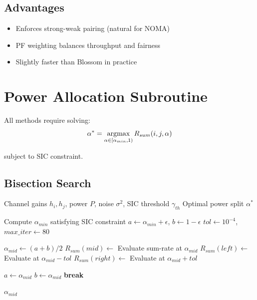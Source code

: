 \subsection{Advantages}

\begin{itemize}
    \item Enforces strong-weak pairing (natural for NOMA)
    \item PF weighting balances throughput and fairness
    \item Slightly faster than Blossom in practice
\end{itemize}

\section{Power Allocation Subroutine}

All methods require solving:
\begin{equation}
\alpha^* = \operatorname*{argmax}_{\alpha \in [\alpha_{min}, 1)} R_{sum}(i,j,\alpha)
\end{equation}

subject to SIC constraint.

\subsection{Bisection Search}

\begin{algorithm}[H]
\caption{Power Allocation via Bisection}
\begin{algorithmic}[1]
\Require Channel gains $h_i, h_j$, power $P$, noise $\sigma^2$, SIC threshold $\gamma_{th}$
\Ensure Optimal power split $\alpha^*$

\State Compute $\alpha_{min}$ satisfying SIC constraint
\State $a \gets \alpha_{min} + \epsilon$, $b \gets 1 - \epsilon$
\State $tol \gets 10^{-4}$, $max\_iter \gets 80$

    \State $\alpha_{mid} \gets (a + b) / 2$
    \State $R_{sum}(mid) \gets $ Evaluate sum-rate at $\alpha_{mid}$
    \State $R_{sum}(left) \gets $ Evaluate at $\alpha_{mid} - tol$
    \State $R_{sum}(right) \gets $ Evaluate at $\alpha_{mid} + tol$
    
        \State $a \gets \alpha_{mid}$
        \State $b \gets \alpha_{mid}$
    \Else
        \State \textbf{break} 
    \EndIf
\EndFor

\State \Return $\alpha_{mid}$
\end{algorithmic}
\end{algorithm}

